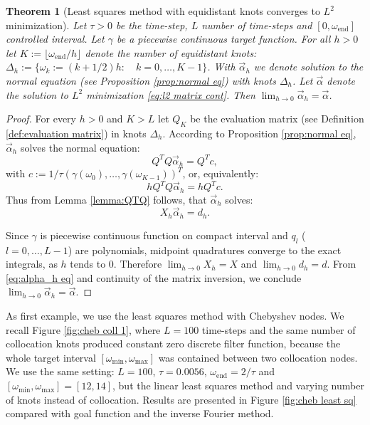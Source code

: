 \documentclass[a4paper,11pt,bibliography=totoc,listof=totoc,headinclude=true,cleardoublepage=empty,oneside]{scrbook}
\newtheorem{theorem}{Theorem}[chapter]
\newcommand{\e}{\mathrm{end}}
\begin{document}
\begin{theorem}[Least squares method with equidistant knots converges to $L^2$ minimization]\label{theorem:lsq converges to l2}
    Let $\tau>0$ be the time-step, $L$ number of time-steps and $[0, \omega_\e]$ controlled interval. Let $\gamma$ be a piecewise continuous target function. For all $h>0$ let $K := \lfloor \omega_\e/h\rfloor $ denote the number of equidistant knots: $ \Delta_h := \{\omega_k := (k+1/2)h : \quad k=0, \dots, K-1\}$. With $\Vec{\alpha}_h$ we denote solution to the normal equation (see Proposition \ref{prop:normal eq}) with knots $\Delta_h$. Let $\Vec{\alpha}$ denote the solution to $L^2$ minimization \eqref{eq:l2 matrix cont}. Then $\lim_{h\rightarrow 0} \Vec{\alpha}_h = \Vec{\alpha}$.

\end{theorem}
\begin{proof}
    For every $h>0$ and $K>L$ let $Q_K$ be the evaluation matrix (see Definition \ref{def:evaluation matrix}) in knots $\Delta_h$. According to Proposition \ref{prop:normal eq}, $\Vec{\alpha}_h$ solves the normal equation: 
    \begin{equation*}
        Q^T Q \Vec{\alpha}_h = Q^Tc,
    \end{equation*}
    with $c:= 1/\tau \left(\gamma(\omega_0), \dots, \gamma(\omega_{K-1})\right)^T$, or, equivalently:
    \begin{equation*}
        hQ^T Q \Vec{\alpha}_h = hQ^Tc.
    \end{equation*}
    Thus from Lemma \ref{lemma:QTQ} follows, that $\Vec{\alpha}_h$ solves:
    \begin{equation}\label{eq:alpha_h eq}
        X_h \Vec{\alpha}_h = d_h.
    \end{equation}
    
    Since $\gamma$ is piecewise continuous function on compact interval and $q_l$ ($l = 0, \dots, L-1$) are polynomials, midpoint quadratures converge to the exact integrals, as $h$ tends to 0. Therefore $\lim_{h\rightarrow 0} X_h = X$ and $\lim_{h\rightarrow 0} d_h = d$. From \eqref{eq:alpha_h eq} and continuity of the matrix inversion, we conclude $\lim_{h\rightarrow 0} \Vec{\alpha}_h = \Vec{\alpha}$.
\end{proof}

As first example, we use the least squares method with Chebyshev nodes. We recall Figure \ref{fig:cheb coll 1}, where $L=100$ time-steps and the same number of collocation knots produced constant zero discrete filter function, because the whole target interval $\left[\omega_{\min}, \omega_{\max}\right]$ was contained between two collocation nodes. We use the same setting: $L=100$, $\tau = 0.0056$, $\omega_\e = 2/\tau$ and $\left[\omega_{\min}, \omega_{\max}\right] = [12, 14]$, but the linear least squares method  and varying number of knots instead of collocation. Results are presented in Figure \ref{fig:cheb least sq} compared with goal function and the inverse Fourier method.
\end{document}
